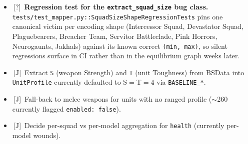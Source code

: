 \documentclass[11pt,a4paper]{article}
\newcommand{\jake}{\textcolor{jakeorange}{\textsf{[J]}}}
\newcommand{\either}{\textcolor{eithergrey}{\textsf{[?]}}}
\newcommand{\todo}{\ding{109}\,}    %
\newcommand{\done}{\ding{51}\,}     %
\begin{document}
\begin{itemize}[label={},leftmargin=*,itemsep=2pt]
\begin{itemize}[label={},leftmargin=*,itemsep=2pt]
        (\texttt{<modifier type="set" field=pts><condition
        type="greaterThan" field="selections" childId="model"
        value="N">}) now read $N$ as the upper bound of the base cost
        tier. Jakhals (65 pts $\to$ 6.5 pts/model at $N{=}10$) and
        Neurogaunts (45 pts $\to$ 4.1 pts/model at $N{=}11$) were the
        canonical victims; cost-tier inference fires whenever the
        static signal under-reports.
      \item \emph{2026-05-17, stale balancer overrides:} the
        \texttt{points\_override} entries written by
        \texttt{sweg\_balance\_mc} for Crisis Fireknife, Crisis
        Sunforge, Deathshroud Terminators, Plague Marines, Rubric
        Marines, Scarab Occult Terminators, and Hearthkyn Warriors
        had been calibrated against the pre-fix
        \texttt{min\_models} (so the per-model value was implicitly
        the per-\emph{squad} cost). With the model counts corrected,
        these inflated squad costs to 2.5--3$\times$ GW MFM and
        priced Crisis suits out of the T'au Kauyon archetype seed
        budget. Stale entries removed from \texttt{overrides.json};
        future balancer runs will repopulate them against the now-
        correct model counts.
    \end{itemize}
  \item \done \either\ \textbf{Regression test for the
    \texttt{extract\_squad\_size} bug class.}
    \texttt{tests/test\_mapper.py::SquadSizeShapeRegressionTests}
    pins one canonical victim per encoding shape (Intercessor Squad,
    Devastator Squad, Plaguebearers, Breacher Team, Servitor
    Battleclade, Pink Horrors, Neurogaunts, Jakhals) against its
    known correct \texttt{(min, max)}, so silent regressions surface
    in CI rather than in the equilibrium graph weeks later.
  \item \todo \jake\ Extract \texttt{S} (weapon Strength) and \texttt{T}
    (unit Toughness) from BSData into \texttt{UnitProfile} \textemdash{}
    currently defaulted to S$=$T$=4$ via \texttt{BASELINE\_*}.
  \item \todo \jake\ Fall-back to melee weapons for units with no ranged
    profile ($\sim$260 currently flagged \texttt{enabled: false}).
  \item \todo \jake\ Decide per-squad vs per-model aggregation
    for \texttt{health} (currently per-model wounds).
\end{itemize}

\end{document}
